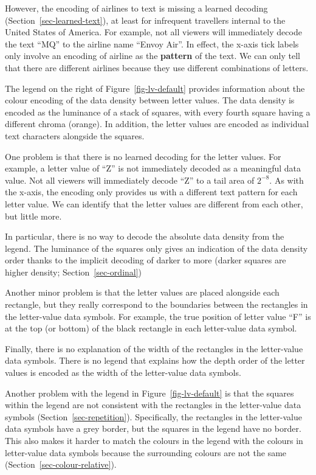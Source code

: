 \documentclass[
  letterpaper,
  DIV=11,
  numbers=noendperiod]{scrreprt}
\providecommand{\tightlist}{%
  \setlength{\itemsep}{0pt}\setlength{\parskip}{0pt}}
\begin{document}
However, the encoding of airlines to text is missing a learned decoding
(Section~\ref{sec-learned-text}), at least for infrequent travellers
internal to the United States of America. For example, not all viewers
will immediately decode the text ``MQ'' to the airline name ``Envoy
Air''. In effect, the x-axis tick labels only involve an encoding of
airline as the \textbf{pattern} of the text. We can only tell that there
are different airlines because they use different combinations of
letters.

The legend on the right of Figure~\ref{fig-lv-default} provides
information about the colour encoding of the data density between letter
values. The data density is encoded as the luminance of a stack of
squares, with every fourth square having a different chroma (orange). In
addition, the letter values are encoded as individual text characters
alongside the squares.

One problem is that there is no learned decoding for the letter values.
For example, a letter value of ``Z'' is not immediately decoded as a
meaningful data value. Not all viewers will immediately decode ``Z'' to
a tail area of \(2^{-8}\). As with the x-axis, the encoding only
provides us with a different text pattern for each letter value. We can
identify that the letter values are different from each other, but
little more.

In particular, there is no way to decode the absolute data density from
the legend. The luminance of the squares only gives an indication of the
data density order thanks to the implicit decoding of darker to more
(darker squares are higher density; Section~\ref{sec-ordinal})

Another minor problem is that the letter values are placed alongside
each rectangle, but they really correspond to the boundaries between the
rectangles in the letter-value data symbols. For example, the true
position of letter value ``F'' is at the top (or bottom) of the black
rectangle in each letter-value data symbol.

Finally, there is no explanation of the width of the rectangles in the
letter-value data symbols. There is no legend that explains how the
depth order of the letter values is encoded as the width of the
letter-value data symbols.

\begin{description}
\tightlist
\item[Encoding structure]
Another problem with the legend in Figure~\ref{fig-lv-default} is that
the squares within the legend are not consistent with the rectangles in
the letter-value data symbols (Section~\ref{sec-repetition}).
Specifically, the rectangles in the letter-value data symbols have a
grey border, but the squares in the legend have no border. This also
makes it harder to match the colours in the legend with the colours in
letter-value data symbols because the surrounding colours are not the
same (Section~\ref{sec-colour-relative}).
\end{description}
\end{document}
